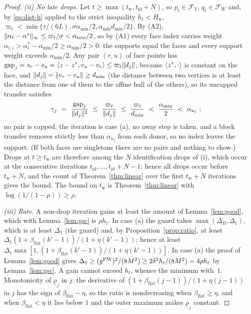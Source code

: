 \begin{proof}
\emph{(ii) No late drops.} Let $t\ge\max(t_{\mathrm w},t_{\mathrm{id}}+N)$,
so $p_t\in\mathcal F_V$, $q_t\in\mathcal F_W$ and, by \eqref{eq:dist-h}
applied to the strict inequality $h_t<H_{\mathrm w}$,
$\varpi_t<\min\{\tau/(6L),\sigma\alpha_{\min}/2,\alpha_{\min}d_{\min}/2\}$.
By (A2), $\lVert \alpha_t-\alpha^* \rVert_\infty\le \varpi_t/\sigma<\alpha_{\min}/2$,
so by (A1) every face index carries weight
$\alpha_{t,i}>\alpha^*_i-\alpha_{\min}/2\ge\alpha_{\min}/2>0$: the
supports equal the faces and every support weight exceeds
$\alpha_{\min}/2$. Any pair $(r,u)$ of face points has
$\mathrm{gap}_j=s_r-s_u=\langle z-z^*, v_u-v_r \rangle\le\varpi_t\lVert d_j \rVert$,
because $\langle z^*, \cdot \rangle$ is constant on the face, and
$\lVert d_j \rVert=\lVert v_r-v_u \rVert\ge d_{\min}$ (the distance between two
vertices is at least the distance from one of them to the affine hull of
the others), so its uncapped transfer satisfies
\[
\gamma_j\ =\ \frac{\mathrm{gap}_j}{\norm{d_j}^2}\ \le\ \frac{\varpi_t}{\norm{d_j}}\ \le\ \frac{\varpi_t}{d_{\min}}\ <\ \frac{\alpha_{\min}}2\ <\ \alpha_{u_j}:
\]
no pair is capped, the iteration is case (a), no away step is taken,
and a block transfer removes strictly less than $\alpha_{u_j}$ from each
donor, so no index leaves the support. (If both faces are singletons
there are no pairs and nothing to show.) Drops at $t\ge t_{\mathrm w}$ are therefore among the
$N$ identification drops of (i), which occur at the consecutive iterations
$t_{\mathrm{id}},\dots,t_{\mathrm{id}}+N-1$; hence all drops occur before
$t_{\mathrm w}+N$, and the count of Theorem~\ref{thm:linear} over the
first $t_{\mathrm w}+N$ iterations gives the bound. The bound on
$t_{\mathrm w}$ is Theorem~\ref{thm:linear} with
$\log(1/(1-\rho))\ge\rho$.

\emph{(iii) Rate.} A non-drop iteration gains at least the amount of
Lemma~\ref{lem:good}, which with Lemma~\ref{lem:gsc} is $\rho h_t$. In
case (a) the guard takes $\max(\Delta_B,\Delta_1)$, which is at least
$\Delta_1$ (the guard) and, by Proposition~\ref{prop:ratio}, at least
$\Delta_1(1+\beta_{\mathrm{flat}}(k'-1))/(1+\eta(k'-1))$; hence at least
$\Delta_1\max[1,(1+\beta_{\mathrm{flat}}(k'-1))/(1+\eta(k'-1))]$. In case
(a) the proof of Lemma~\ref{lem:good} gives
$\Delta_1\ge(g^{\mathrm{PW}})^2/(8M^2)\ge2\delta^2h_t/(8M^2)=4\rho h_t$ by
Lemma~\ref{lem:gsc}. A gain cannot exceed $h_t$, whence the minimum
with~$1$. Monotonicity of $\underline\rho_j$ in $j$: the derivative of
$(1+\beta_{\mathrm{flat}}(j-1))/(1+\eta(j-1))$ in $j$ has the sign of
$\beta_{\mathrm{flat}}-\eta$, so the ratio is nondecreasing when
$\beta_{\mathrm{flat}}\ge\eta$, and when $\beta_{\mathrm{flat}}<\eta$ it
lies below $1$ and the outer maximum makes $\underline\rho_j$ constant.
\end{proof}

